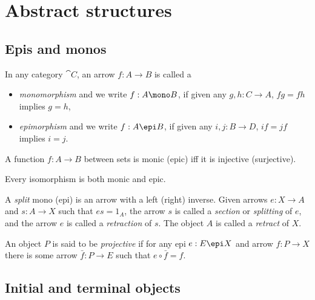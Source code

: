 \documentclass{article}
\begin{document}
\section{Abstract structures}


\subsection{Epis and monos}

\begin{definition}[Awodey 2.1]
    In any category $\cat C$, an arrow $f:A\to B$ is called a
    \begin{itemize}
        \item \emph{monomorphism} and we write $f:A\mono B$, if given any $g,h:C\to A$, $fg=fh$ implies $g=h$,
        \item \emph{epimorphism} and we write $f:A\epi B$, if given any $i,j:B\to D$, $if=jf$ implies $i=j$.
    \end{itemize}
\end{definition}

\begin{proposition}[Awodey 2.2]
    A function $f:A\to B$ between sets is monic (epic) iff it is injective (surjective).
\end{proposition}

\begin{proposition}[Awodey 2.6]
    Every isomorphism is both monic and epic.
\end{proposition}

\begin{definition}[Awodey 2.7]
    A \emph{split} mono (epi) is an arrow with a left (right) inverse. Given
    arrows $e:X\to A$ and $s:A\to X$ such that $es=1_A$, the arrow $s$ is called
    a \emph{section} or \emph{splitting} of $e$, and the arrow $e$ is called a
    \emph{retraction} of $s$. The object $A$ is called a \emph{retract} of $X$.
\end{definition}

\begin{definition}
    An object $P$ is said to be \emph{projective} if for any epi $e:E\epi X$
    and arrow $f:P\to X$ there is some arrow $\bar f:P\to E$ such that
    $e\circ \bar f = f$.
\end{definition}

\subsection{Initial and terminal objects}
\end{document}
